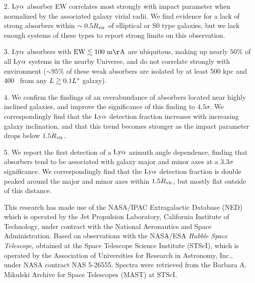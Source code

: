 2. $\rm Ly\alpha$ absorber EW correlates most strongly with impact parameter when normalized by the associated galaxy virial radii. We find evidence for a lack of strong absorbers within $\sim 0.5 R_{\rm vir}$ of elliptical or S0 type galaxies, but we lack enough systems of these types to report strong limits on this observation.

3. $\rm Ly\alpha$ absorbers with $\rm EW \lesssim 100~m\AA$ are ubiquitous, making up nearly $50\%$ of all $\rm Ly\alpha$ systems in the nearby Universe, and do not correlate strongly with environment ($\sim95\%$ of these weak absorbers are isolated by at least 500 kpc and 400 \kms~from any $L \gtrsim0.1 L^{\**}$ galaxy). 

4. We confirm the \cite{french2017} findings of an overabundance of absorbers located near highly inclined galaxies, and improve the significance of this finding to $4.5\sigma$. We correspondingly find that the $\rm Ly\alpha$ detection fraction increases with increasing galaxy inclination, and that this trend becomes stronger as the impact parameter drops below $1.5 R_{\rm vir}$.


5. We report the first detection of a $\rm Ly\alpha$ azimuth angle dependence, finding that absorbers tend to be associated with galaxy major and minor axes at a $3.3\sigma$ significance. We correspondingly find that the $\rm Ly\alpha$ detection fraction is double peaked around the major and minor axes within $1.5 R_{\rm vir}$, but mostly flat outside of this distance.





\acknowledgements

This research has made use of the NASA/IPAC Extragalactic Database (NED) which is operated by the Jet Propulsion Laboratory, California Institute of Technology, under contract with the National Aeronautics and Space Administration. Based on observations with the NASA/ESA \textit{Hubble Space Telescope}, obtained at the Space Telescope Science Institute (STScI), which is operated by the Association of Universities for Research in Astronomy, Inc., under NASA contract NAS 5-26555. Spectra were retrieved from the Barbara A. Mikulski Archive for Space Telescopes (MAST) at STScI.

